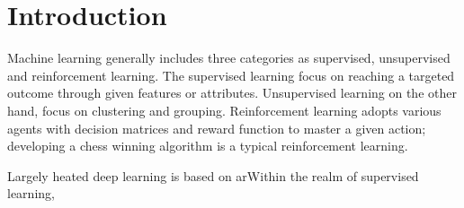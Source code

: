 \section{Introduction}

Machine learning generally includes three categories as supervised, unsupervised and reinforcement learning. The supervised learning focus on reaching a targeted outcome through given features or attributes. Unsupervised learning on the other hand, focus on clustering and grouping. Reinforcement learning adopts various agents with decision matrices and reward function to master a given action; developing a chess winning algorithm is a typical reinforcement learning.
\par
Largely heated deep learning is based on arWithin the realm of supervised learning, 
